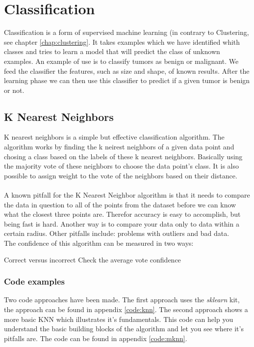 \chapter{Classification}
Classification is a form of supervised machine learning (in contrary to Clustering, see chapter \ref{chap:clustering}. It takes examples which we have identified whith classes and tries to learn a model that will predict the class of unknown examples. An example of use is to classify tumors as benign or malignant. We feed the classifier the features, such as size and shape, of known results. After the learning phase we can then use this classifier to predict if a given tumor is benign or not.

\section{K Nearest Neighbors}
K nearest neighbors is a simple but effective classification algorithm. The algorithm works by finding the k neirest neighbors of a given data point and chosing a class based on the labels of these k nearest neighbors. Basically using the majority vote of these neighbors to choose the data point's class. It is also possible to assign weight to the vote of the neighbors based on their distance.\\
\\
A known pitfall for the K Nearest Neighbor algorithm is that it needs to compare the data in question to all of the points from the dataset before we can know what the closest three points are. Therefor accuracy is easy to accomplish, but being fast is hard. Another way is to compare your data only to data within a certain radius. Other pitfalls include: problems with outliers and bad data.
\\
The confidence of this algorithm can be measured in two ways:
\begin{itemize}
\elem Correct versus incorrect
\elem Check the average vote confidence
\end{itemize}

\subsection{Code examples}
Two code approaches have been made. The first approach uses the \emph{sklearn} kit, the approach can be found in appendix \ref{code:knn}. The second approach shows a more basic KNN which illustrates it's fundamentals. This code can help you understand the basic building blocks of the algorithm and let you see where it's pitfalls are. The code can be found in appendix \ref{code:mknn}.

